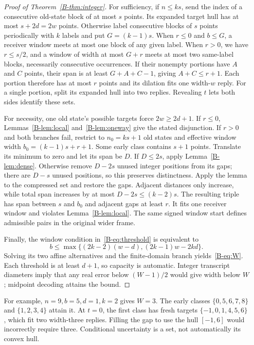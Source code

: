 \begin{proof}[Proof of Theorem~\ref{B-thm:integer}]
For sufficiency, if $n\leq ks$, send the index of a consecutive old-state block of at most $s$ points. Its expanded target hull has at most $s+2d=2w$ points. Otherwise label consecutive blocks of $s$ points periodically with $k$ labels and put $G=(k-1)s$. When $r\leq0$ and $b\leq G$, a receiver window meets at most one block of any given label. When $r>0$, we have $r\leq s/2$, and a window of width at most $G+r$ meets at most two same-label blocks, necessarily consecutive occurrences. If their nonempty portions have $A$ and $C$ points, their span is at least $G+A+C-1$, giving $A+C\leq r+1$. Each portion therefore has at most $r$ points and its dilation fits one width-$w$ reply. For a single portion, split its expanded hull into two replies. Revealing $t$ lets both sides identify these sets.

For necessity, one old state's possible targets force $2w\geq2d+1$. If $r\leq0$, Lemmas~\ref{B-lem:local} and~\ref{B-lem:oneway} give the stated disjunction. If $r>0$ and both branches fail, restrict to $n_0=ks+1$ old states and effective window width $b_0=(k-1)s+r+1$. Some early class contains $s+1$ points. Translate its minimum to zero and let its span be $D$. If $D\leq2s$, apply Lemma~\ref{B-lem:dense}. Otherwise remove $D-2s$ unused integer positions from its gaps; there are $D-s$ unused positions, so this preserves distinctness. Apply the lemma to the compressed set and restore the gaps. Adjacent distances only increase, while total span increases by at most $D-2s\leq(k-2)s$. The resulting triple has span between $s$ and $b_0$ and adjacent gaps at least $r$. It fits one receiver window and violates Lemma~\ref{B-lem:local}. The same signed window start defines admissible pairs in the original wider frame.

Finally, the window condition in~\eqref{B-eq:threshold} is equivalent to
\begin{equation}\label{B-eq:affine}
b\leq\max\{(2k-2)(w-d),(2k-1)w-2kd\}.
\end{equation}
Solving its two affine alternatives and the finite-domain branch yields~\eqref{B-eq:W}. Each threshold is at least $d+1$, so capacity is automatic. Integer transcript diameters imply that any real error below $(W-1)/2$ would give width below $W$; midpoint decoding attains the bound.
\end{proof}

For example, $n=9,b=5,d=1,k=2$ gives $W=3$. The early classes $\{0,5,6,7,8\}$ and $\{1,2,3,4\}$ attain it. At $t=0$, the first class has fresh targets $\{-1,0,1,4,5,6\}$, which fit two width-three replies. Filling the gap to use the hull $[-1,6]$ would incorrectly require three. Conditional uncertainty is a set, not automatically its convex hull.

